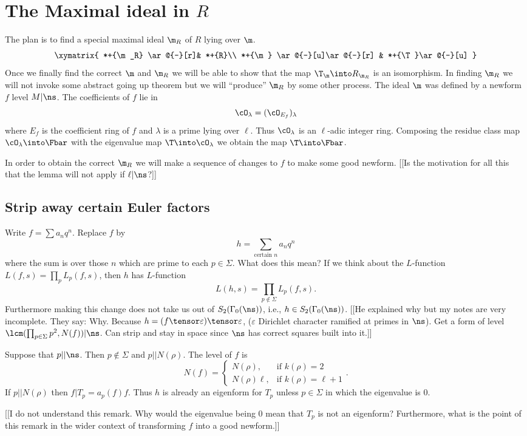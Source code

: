\documentclass{report}
\begin{document}
\section{The Maximal ideal in $R$}
The plan is to find a special maximal ideal $\m_R$
of $R$ lying over $\m$.
$$\xymatrix{
*+{\m_R} \ar@{-}[r]& *+{R}\\
*+{\m} \ar@{-}[u]\ar@{-}[r] & *+{\T}\ar@{-}[u]
}$$
Once we finally find the correct $\m$ and $\m_R$ we will
be able to show that the map
$\T_{\m}\into R_{\m_R}$ is an isomorphism.
In finding $\m_R$ we will not invoke some abstract going up theorem
but we will ``produce'' $\m_R$ by some other process.
The ideal $\m$ was defined by a newform $f$ level $M|\ns$.
The coefficients of $f$ lie in
$$\cO_{\lambda}=(\cO_{E_f})_{\lambda}$$
where $E_f$ is the coefficient ring of $f$ and $\lambda$ is a
prime lying over $\ell$. Thus $\cO_{\lambda}$ is an $\ell$-adic
integer ring. Composing the residue class map $\cO_{\lambda}\into\Fbar$
with the eigenvalue map $\T\into\cO_{\lambda}$ we obtain
the map $\T\into\Fbar$.

In order to obtain the correct $\m_{R}$ we will make a sequence
of changes to $f$ to make some good newform. [[Is the motivation for
all this that the lemma will not apply if $\ell|\ns$?]]

\subsection{Strip away certain Euler factors}
Write
$f=\sum a_n q^n$. Replace $f$ by
$$h=\sum_{\text{certain $n$}} a_n q^n$$
where the sum is over those $n$ which are prime to
each $p\in\Sigma$.
What does this mean?
 If we think about the $L$-function
$L(f,s)=\prod_p L_p(f,s)$, then $h$ has $L$-function
$$L(h,s)=\prod_{p\not\in\Sigma} L_p(f,s).$$
Furthermore making this change does not take us out of $S_2(\Gamma_0(\ns))$,
i.e., $h\in S_2(\Gamma_0(\ns))$.
[[He explained why but my notes are very incomplete. They say: Why. Because
$h=(f\tensor\varepsilon)\tensor\varepsilon$, ($\varepsilon$ Dirichlet
character ramified at primes in $\ns$). Get a form of level
$\lcm(\prod_{p\in\Sigma}p^2,N(f))|\ns$.
Can strip and stay in space since $\ns$ has correct squares
built into it.]]

\begin{remark}
Suppose that $p||\ns$. Then $p\not\in\Sigma$ and $p||N(\rho)$.
The level of $f$ is
$$N(f)=\begin{cases}N(\rho),&\text{if $k(\rho)=2$}\\
                    N(\rho)\ell,&\text{if $k(\rho)=\ell+1$}\end{cases}.$$
If $p||N(\rho)$ then $f|T_p=a_p(f)f$.
Thus $h$ is already an eigenform for $T_p$ unless $p\in\Sigma$
in which the eigenvalue is $0$.

[[I do not understand this remark. Why would the eigenvalue
being 0 mean that $T_p$ is not an eigenform? Furthermore, what is the
point of this remark in the wider context of transforming $f$ into a
good newform.]]
\end{remark}
\end{document}
